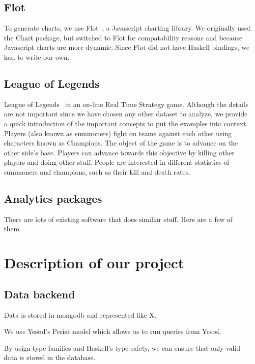 \documentclass{chi2009}
\begin{document}
\subsection{Flot}

To generate charts, we use Flot~\cite{flot}, a Javascript charting library. We originally used the Chart package, but switched to Flot for compatability reasons and because Javascript charts are more dynamic. Since Flot did not have Haskell bindings, we had to write our own. 

\subsection{League of Legends}

League of Legends~\cite{lol} in an on-line Real Time Strategy game. Although the details are not important since we have chosen any other dataset to analyze, we provide a quick introduction of the important concepts to put the examples into context. Players (also known as summoners) fight on teams against each other using characters known as Champions. The object of the game is to advance on the other side's base. Players can advance towards this objective by killing other players and doing other stuff. People are interested in different statistics of summoners and champions, such as their kill and death rates. 

\subsection{Analytics packages}

There are lots of existing software that does similiar stuff. Here are a few of them. 

\section{Description of our project}
\label{package}

\subsection{Data backend}

Data is stored in mongodb and represented like X.

We use Yesod's Perist model which allows us to run queries from Yesod.

By usign type families and Haskell's type safety, we can ensure that only valid data is stored in the database. 
\end{document}
